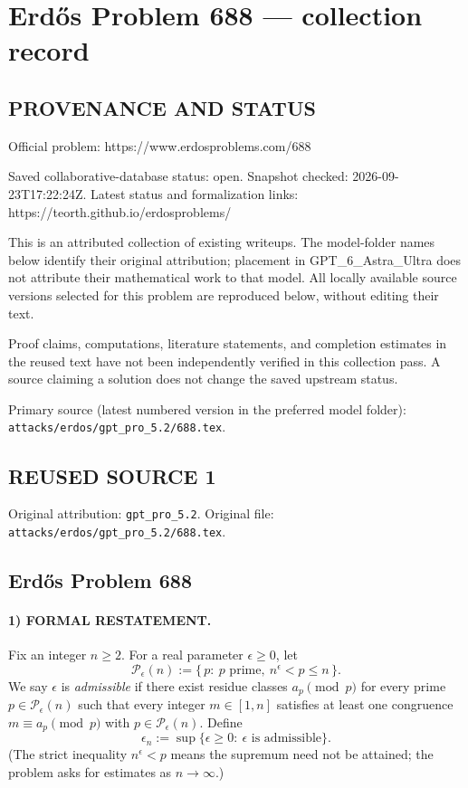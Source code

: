 \section*{Erd\H{o}s Problem 688 --- collection record}

\subsection*{PROVENANCE AND STATUS}
Official problem: https://www.erdosproblems.com/688

Saved collaborative-database status: open.
Snapshot checked: 2026-09-23T17:22:24Z.
Latest status and formalization links: https://teorth.github.io/erdosproblems/

This is an attributed collection of existing writeups. The model-folder names below identify their original attribution; placement in GPT\_6\_Astra\_Ultra does not attribute their mathematical work to that model. All locally available source versions selected for this problem are reproduced below, without editing their text.

Proof claims, computations, literature statements, and completion estimates in the reused text have not been independently verified in this collection pass. A source claiming a solution does not change the saved upstream status.

Primary source (latest numbered version in the preferred model folder): \texttt{attacks/erdos/gpt\_pro\_5.2/688.tex}.

\subsection*{REUSED SOURCE 1}
Original attribution: \texttt{gpt\_pro\_5.2}.
Original file: \texttt{attacks/erdos/gpt\_pro\_5.2/688.tex}.


\subsection*{Erd\H{o}s Problem 688}

\paragraph{1) FORMAL RESTATEMENT.}
Fix an integer $n\ge 2$. For a real parameter $\epsilon\ge 0$, let
\[
\mathcal P_\epsilon(n):=\{\,p:\ p\text{ prime},\ n^\epsilon<p\le n\,\}.
\]
We say $\epsilon$ is \emph{admissible} if there exist residue classes $a_p\pmod p$ for every prime $p\in\mathcal P_\epsilon(n)$ such that
every integer $m\in[1,n]$ satisfies at least one congruence $m\equiv a_p\pmod p$ with $p\in\mathcal P_\epsilon(n)$.
Define
\[
\epsilon_n:=\sup\{\epsilon\ge 0:\ \epsilon\text{ is admissible}\}.
\]
(The strict inequality $n^\epsilon<p$ means the supremum need not be attained; the problem asks for estimates as $n\to\infty$.)

